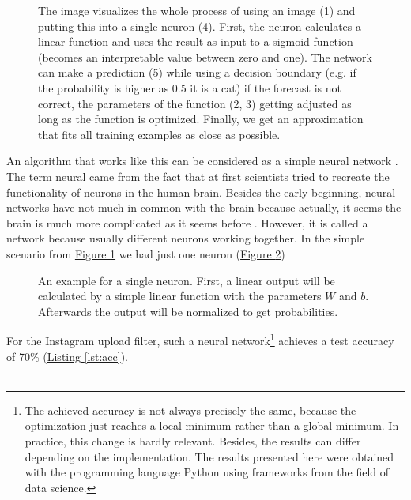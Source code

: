 \begin{figure}[htp]
	\caption{The image visualizes the whole process of using an image (1) and putting this into a single neuron (4). First, the neuron calculates a linear function and uses the result as input to a sigmoid function (becomes an interpretable value between zero and one). The network can make a prediction (5) while using a decision boundary (e.g. if the probability is higher as 0.5 it is a cat) if the forecast is not correct, the parameters of the function (2, 3) getting adjusted as long as the function is optimized. Finally, we get an approximation that fits all training examples as close as possible.}
	\label{fig:08_process_of_pretictions_for_a_cat_image}
\end{figure}

An algorithm that works like this can be considered as a simple neural network \cite{Britz2015}. The term neural came from the fact that at first scientists tried to recreate the functionality of neurons in the human brain. Besides the early beginning, neural networks have not much in common with the brain because actually, it seems the brain is much more complicated as it seems before \cite{Kriesel2007NeuralNetworks}. However, it is called a network because usually different neurons working together. In the simple scenario from \hyperref[fig:08_process_of_pretictions_for_a_cat_image]{Figure \ref{fig:08_process_of_pretictions_for_a_cat_image}} we had just one neuron (\hyperref[fig:09_example_of_a_single_neuron]{Figure \ref{fig:09_example_of_a_single_neuron}})

\begin{figure}[htp]
	\centering
	\caption{An example for a single neuron. First, a linear output will be calculated by a simple linear function with the parameters \(W\) and \(b\). Afterwards the output will be normalized to get probabilities.}
	\label{fig:09_example_of_a_single_neuron}
\end{figure}

For the Instagram upload filter, such a neural network\footnote{The achieved accuracy is not always precisely the same, because the optimization just reaches a local minimum rather than a global minimum. In practice, this change is hardly relevant. Besides, the results can differ depending on the implementation. The results presented here were obtained with the programming language Python using frameworks from the field of data science.} achieves a test accuracy of 70\% (\hyperref[lst:acc]{Listing \ref{lst:acc}}).\\\\

